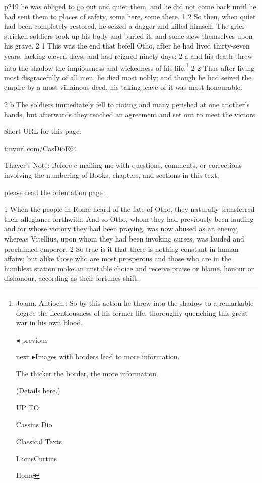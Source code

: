 p219 he was obliged to go out and quiet them, and he did not come back until he had sent them to places of safety, some here, some there. 1 2 So then, when quiet had been completely restored, he seized a dagger and killed himself. The grief-stricken soldiers took up his body and buried it, and some slew themselves upon his grave. 2 1 This was the end that befell Otho, after he had lived thirty-seven years, lacking eleven days, and had reigned ninety days; 2 a and his death threw into the shadow the impiousness and wickedness of his life.\texthebrew{⁠}\footnote{Joann. Antioch.: So by this action he threw into the shadow to a remarkable degree the licentiousness of his former life, thoroughly quenching this great war in his own blood.

\texthebrew{◂} previous

next \texthebrew{▸}Images with borders lead to more information.

The thicker the border, the more information.

(Details here.)

UP TO:

Cassius Dio

Classical Texts

LacusCurtius

Home} 2 2 Thus after living most disgracefully of all men, he died most nobly; and though he had seized the empire by a most villainous deed, his taking leave of it was most honourable.

2 b The soldiers immediately fell to rioting and many perished at one another's hands, but afterwards they reached an agreement and set out to meet the victors.


Short URL for this page:

tinyurl.com/CasDioE64

Thayer's Note: Before e-mailing me with questions, comments, or corrections involving the numbering of Books, chapters, and sections in this text,

please read the orientation page .


1
When the people in Rome heard of the fate of Otho, they naturally transferred their allegiance forthwith. And so Otho, whom they had previously been lauding and for whose victory they had been praying, was now abused as an enemy, whereas Vitellius, upon whom they had been invoking curses, was lauded and proclaimed emperor. 2 So true is it that there is nothing constant in human affairs; but alike those who are most prosperous and those who are in the humblest station make an unstable choice and receive praise or blame, honour or dishonour, according as their fortunes shift.

